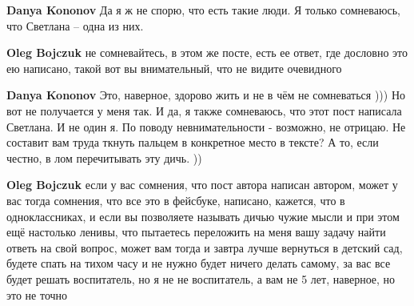 \begin{itemize}
\begin{itemize}
 
\textbf{Danya Kononov} Да я ж не спорю, что есть такие люди. Я только сомневаюсь, что Светлана – одна из них.

 
\textbf{Oleg Bojczuk} не сомневайтесь, в этом же посте, есть ее ответ, где дословно это ею написано, такой вот вы внимательный, что не видите очевидного

 
\textbf{Danya Kononov} Это, наверное, здорово жить и не в чём не сомневаться ))) Но вот не получается у меня так. И да, я также сомневаюсь, что этот пост написала Светлана. И не один я. По поводу невнимательности - возможно, не отрицаю. Не составит вам труда ткнуть пальцем в конкретное место в тексте? А то, если честно, в лом перечитывать эту дичь. ))

 
\textbf{Oleg Bojczuk} если у вас сомнения, что пост автора написан автором, может у вас тогда сомнения, что все это в фейсбуке, написано, кажется, что в одноклассниках, и если вы позволяете называть дичью чужие мысли и при этом ещё настолько ленивы, что пытаетесь переложить на меня вашу задачу найти ответь на свой вопрос, может вам тогда и завтра лучше вернуться в детский сад, будете спать на тихом часу и не нужно будет ничего делать самому, за вас все будет решать воспитатель, но я не не воспитатель, а вам не 5 лет, наверное, но это не точно

 

\end{itemize}
\end{itemize}

